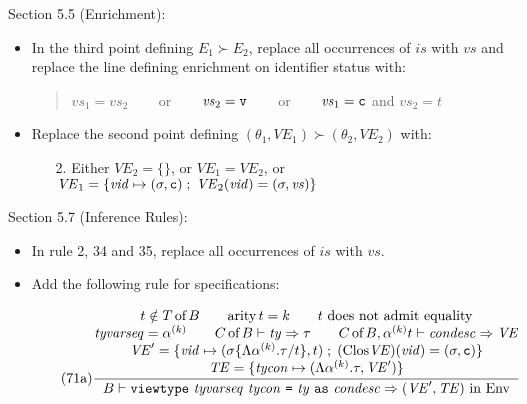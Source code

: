 \documentclass[twoside,titlepage]{article}
\begin{document}
\begin{appendix}
Section 5.5 (Enrichment):
\begin{itemize}
\item In the third point defining $E_1 \succ E_2$, replace all occurrences of $\mathit{is}$ with $\mathit{vs}$ and replace the line defining enrichment on identifier status with:
  \begin{quote}
  $\mathit{vs}_1 = \mathit{vs}_2$ ~~~ or ~~~
  $\mathit{vs}_2 = {\tt v}$ ~~~ or ~~~
  $\mathit{vs}_1 = {\tt c}$ and $\mathit{vs}_2 = t$
  \end{quote}

\item Replace the second point defining $(\theta_1,\mathit{VE}_1) \succ (\theta_2,\mathit{VE}_2)$ with:
  \begin{enumerate}
  \item[2.] Either $\mathit{VE}_2 = \{\}$, or $\mathit{VE}_1 = \mathit{VE}_2$, or $\mathit{VE}_1 = \{\mathit{vid}\mapsto(\sigma,{\tt{c}}) \;;\; \mathit{VE}_2(\mathit{vid}) = (\sigma,\mathit{vs})\}$
  \end{enumerate}
\end{itemize}

Section 5.7 (Inference Rules):
\begin{itemize}
\item In rule 2, 34 and 35, replace all occurrences of $\mathit{is}$ with $\mathit{vs}$.

\item Add the following rule for specifications:

  \begin{equation}
  \tag{71a}
  \frac{
  \begin{array}{@{}c@{}}
  t \notin T\,\mbox{of}\,B
  \qquad
  \mbox{arity}\,t = k
  \qquad
  \mbox{$t$ does not admit equality}
  \\
  \mathit{tyvarseq} = \alpha^{(k)}
  \qquad
  C\,\mbox{of}\,B \vdash \mathit{ty} \Rightarrow \tau
  \qquad
  C\,\mbox{of}\,B,\alpha^{(k)}t \vdash \mathit{condesc} \Rightarrow \mathit{VE}
  \\
  \mathit{VE}' = \{\mathit{vid}\mapsto(\sigma\{\Lambda\alpha^{(k)}.\tau/t\}, t)\;;\;(\mbox{Clos}\mathit{VE})(\mathit{vid}) = (\sigma,{\tt c})\}
  \\
  \mathit{TE} = \{\mathit{tycon}\mapsto(\Lambda\alpha^{(k)}.\tau,\mathit{VE}')\}
  \end{array}
  }{
  \begin{array}{@{}l@{}}
  B \vdash {\tt viewtype}~\mathit{tyvarseq}~\mathit{tycon}~\mbox{\tt=}~\mathit{ty}~{\tt as}~\mathit{condesc} \Rightarrow \mbox{$(\mathit{VE}',\mathit{TE})$ in Env}
  \end{array}
  }
  \end{equation}
\end{itemize}


\end{appendix}
\end{document}
